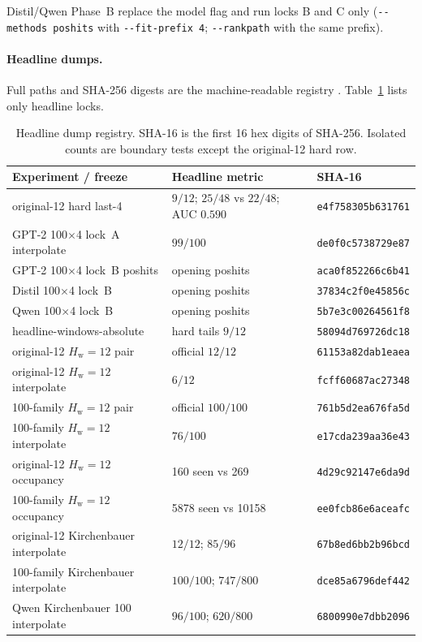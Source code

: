 \documentclass[11pt,a4paper]{article}
\newcommand{\ddash}{\mbox{-}\mbox{-}}
\theoremstyle{definition}
\newcommand{\Hw}{H_{\mathrm{w}}}
\begin{document}
\medskip
\noindent Distil/Qwen Phase~B replace the model flag and run locks B
and C only (\texttt{\ddash methods poshits} with
\texttt{\ddash fit-prefix 4}; \texttt{\ddash rankpath} with the same
prefix).

\paragraph{Headline dumps.}
Full paths and SHA-256 digests are the machine-readable registry
. Table~\ref{tab:artifacts} lists only
headline locks.

\begin{table}[ht]
\centering
\small
\caption{Headline dump registry. SHA-16 is the first 16 hex digits of
SHA-256. Isolated counts are boundary tests except the original-12 hard
row.}
\label{tab:artifacts}
\begin{tabular}{@{}p{4.4cm}p{4.6cm}l@{}}
\toprule
Experiment / freeze & Headline metric & SHA-16 \\
\midrule
original-12 hard last-4 & $9/12$; $25/48$ vs $22/48$; AUC $0.590$ & \texttt{e4f758305b631761} \\
GPT-2 100$\times$4 lock~A interpolate & $99/100$ & \texttt{de0f0c5738729e87} \\
GPT-2 100$\times$4 lock~B poshits & opening poshits & \texttt{aca0f852266c6b41} \\
Distil 100$\times$4 lock~B & opening poshits & \texttt{37834c2f0e45856c} \\
Qwen 100$\times$4 lock~B & opening poshits & \texttt{5b7e3c00264561f8} \\
headline-windows-absolute & hard tails $9/12$ & \texttt{58094d769726dc18} \\
original-12 $\Hw=12$ pair & official $12/12$ & \texttt{61153a82dab1eaea} \\
original-12 $\Hw=12$ interpolate & $6/12$ & \texttt{fcff60687ac27348} \\
100-family $\Hw=12$ pair & official $100/100$ & \texttt{761b5d2ea676fa5d} \\
100-family $\Hw=12$ interpolate & $76/100$ & \texttt{e17cda239aa36e43} \\
original-12 $\Hw=12$ occupancy & 160 seen vs 269 & \texttt{4d29c92147e6da9d} \\
100-family $\Hw=12$ occupancy & 5878 seen vs 10158 & \texttt{ee0fcb86e6aceafc} \\
original-12 Kirchenbauer interpolate & $12/12$; $85/96$ & \texttt{67b8ed6bb2b96bcd} \\
100-family Kirchenbauer interpolate & $100/100$; $747/800$ & \texttt{dce85a6796def442} \\
Qwen Kirchenbauer 100 interpolate & $96/100$; $620/800$ & \texttt{6800990e7dbb2096} \\
\bottomrule
\end{tabular}
\end{table}
\end{document}
